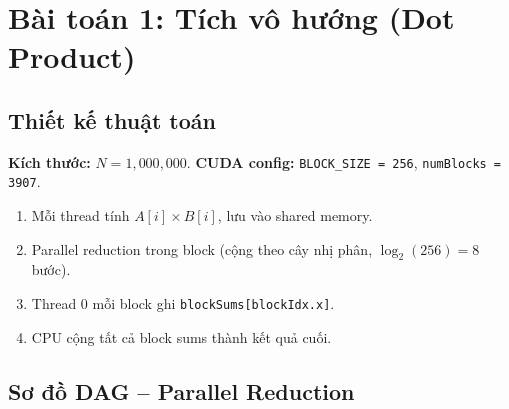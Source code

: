 \documentclass[12pt,a4paper]{article}
\begin{document}
\section{Bài toán 1: Tích vô hướng (Dot Product)}

\subsection{Thiết kế thuật toán}

\textbf{Kích thước:} $N = 1{,}000{,}000$. \textbf{CUDA config:} \texttt{BLOCK\_SIZE = 256}, \texttt{numBlocks = 3907}.

\begin{enumerate}
    \item Mỗi thread tính $A[i] \times B[i]$, lưu vào shared memory.
    \item Parallel reduction trong block (cộng theo cây nhị phân, $\log_2(256) = 8$ bước).
    \item Thread 0 mỗi block ghi \texttt{blockSums[blockIdx.x]}.
    \item CPU cộng tất cả block sums thành kết quả cuối.
\end{enumerate}

\subsection{Sơ đồ DAG -- Parallel Reduction}
\end{document}
